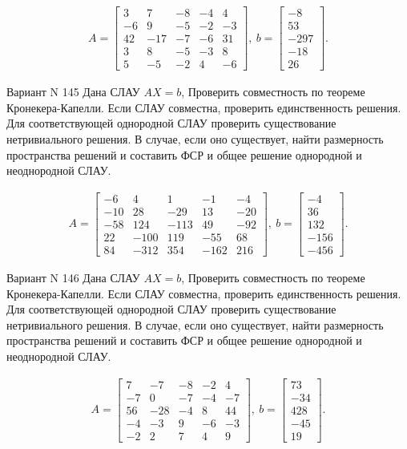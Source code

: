 \documentclass[11pt]{report}
\begin{document}
\begin{align*}
 A = \left[\begin{matrix}3 & 7 & -8 & -4 & 4\\-6 & 9 & -5 & -2 & -3\\42 & -17 & -7 & -6 & 31\\3 & 8 & -5 & -3 & 8\\5 & -5 & -2 & 4 & -6\end{matrix}\right],
\ b = \left[\begin{matrix}-8\\53\\-297\\-18\\26\end{matrix}\right]. 
 \end{align*}

Вариант N 145
Дана СЛАУ $AX = b$,
Проверить совместность по теореме Кронекера-Капелли. Если СЛАУ совместна, проверить единственность решения.
Для соответствующей однородной СЛАУ проверить существование нетривиального решения. В случае, если оно существует,
найти размерность пространства решений и составить ФСР и общее решение однородной  и неоднородной СЛАУ.


\begin{align*}
 A = \left[\begin{matrix}-6 & 4 & 1 & -1 & -4\\-10 & 28 & -29 & 13 & -20\\-58 & 124 & -113 & 49 & -92\\22 & -100 & 119 & -55 & 68\\84 & -312 & 354 & -162 & 216\end{matrix}\right],
\ b = \left[\begin{matrix}-4\\36\\132\\-156\\-456\end{matrix}\right]. 
 \end{align*}

Вариант N 146
Дана СЛАУ $AX = b$,
Проверить совместность по теореме Кронекера-Капелли. Если СЛАУ совместна, проверить единственность решения.
Для соответствующей однородной СЛАУ проверить существование нетривиального решения. В случае, если оно существует,
найти размерность пространства решений и составить ФСР и общее решение однородной  и неоднородной СЛАУ.


\begin{align*}
 A = \left[\begin{matrix}7 & -7 & -8 & -2 & 4\\-7 & 0 & -7 & -4 & -7\\56 & -28 & -4 & 8 & 44\\-4 & -3 & 9 & -6 & -3\\-2 & 2 & 7 & 4 & 9\end{matrix}\right],
\ b = \left[\begin{matrix}73\\-34\\428\\-45\\19\end{matrix}\right]. 
 \end{align*}
\end{document}
